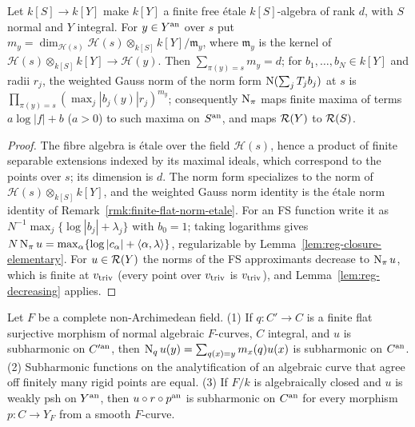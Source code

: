 \begin{lemma}\label{lem:finite-etale-norm}
\leanok
{}
Let $k[S]\to k[Y]$ make $k[Y]$ a finite free \'etale $k[S]$-algebra of rank $d$, with $S$ normal and $Y$
integral. For $y\in Y^{\mathrm{an}}$ over $s$ put $m_y=\dim_{\mathcal H(s)}\mathcal H(s)\otimes_{k[S]}k[Y]/\mathfrak m_y$,
where $\mathfrak m_y$ is the kernel of $\mathcal H(s)\otimes_{k[S]}k[Y]\to\mathcal H(y)$. Then
$\sum_{\pi(y)=s}m_y=d$; for $b_1,\dots,b_N\in k[Y]$ and radii $r_j$, the weighted Gauss norm of the norm
form $\operatorname{N}(\sum_jT_jb_j)$ at $s$ is $\prod_{\pi(y)=s}(\max_j|b_j(y)|r_j)^{m_y}$; consequently
$\operatorname{N}_\pi$ maps finite maxima of terms $a\log|f|+b$ ($a>0$) to such maxima on $S^{\mathrm{an}}$, and maps
$\mathcal{R}(Y)$ to $\mathcal{R}(S)$.
\end{lemma}

\begin{proof}
\leanok
The fibre algebra is \'etale over the field $\mathcal H(s)$, hence a product of finite separable
extensions indexed by its maximal ideals, which correspond to the points over $s$; its dimension is
$d$. The norm form specializes to the norm of $\mathcal H(s)\otimes_{k[S]}k[Y]$, and the weighted
Gauss norm identity is the \'etale norm identity of Remark~\ref{rmk:finite-flat-norm-etale}. For an FS
function write it as $N^{-1}\max_j\{\log|b_j|+\lambda_j\}$ with $b_0=1$; taking logarithms gives
$N\operatorname{N}_\pi u=\max_\alpha\{\log|c_\alpha|+\langle\alpha,\lambda\rangle\}$, regularizable by
Lemma~\ref{lem:reg-closure-elementary}. For $u\in\mathcal{R}(Y)$ the norms of the FS approximants decrease
to $\operatorname{N}_\pi u$, which is finite at $v_{\mathrm{triv}}$ (every point over $v_{\mathrm{triv}}$ is $v_{\mathrm{triv}}$), and
Lemma~\ref{lem:reg-decreasing} applies.
\end{proof}

\begin{lemma}\label{lem:curves}
\notready
{}
Let $F$ be a complete non-Archimedean field. (1) If $q\colon C'\to C$ is a finite flat surjective
morphism of normal algebraic $F$-curves, $C$ integral, and $u$ is subharmonic on $C'^{\mathrm{an}}$, then
$\operatorname{N}_qu(y)=\sum_{q(x)=y}m_x(q)u(x)$ is subharmonic on $C^{\mathrm{an}}$. (2) Subharmonic functions on the
analytification of an algebraic curve that agree off finitely many rigid points are equal. (3) If
$F/k$ is algebraically closed and $u$ is weakly psh on $Y^{\mathrm{an}}$, then $u\circ r\circ p^{\mathrm{an}}$ is
subharmonic on $C^{\mathrm{an}}$ for every morphism $p\colon C\to Y_F$ from a smooth $F$-curve.
\end{lemma}


